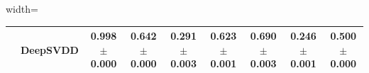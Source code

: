 \documentclass{article}
\begin{document}
\begin{table}[]
\begin{adjustbox}{width=\textwidth}
\begin{tabular}{cl|ccccccc}
        &DeepSVDD & \bf{0.998$\pm$0.000} & \textbf{0.642$\pm$0.000} & \bf{0.291$\pm$0.003} & {0.623$\pm$0.001} & \bf{0.690$\pm$0.003} & 0.246$\pm$0.001 & {0.500$\pm$0.000} \\
         \bottomrule
    \end{tabular}
  \end{adjustbox}
    \label{tab:kitsune}
\end{table}

\end{document}
